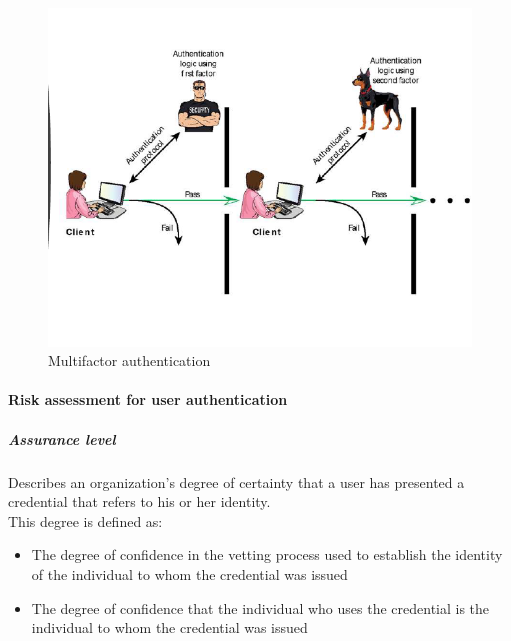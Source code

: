 \documentclass{article}
\begin{document}
                \begin{figure}[h]
                    \begin{center}
                        \includegraphics[scale=0.8]{../immagini/Multifactor_Authentication.png}
                    \end{center}
                    \caption{Multifactor
                    authentication}
                \end{figure}
            
                \paragraph{Risk
                assessment
                for user
                authentication}
                    \subparagraph{Assurance level}
                    Describes an
                    organization’s
                    degree of
                    certainty that a
                    user has
                    presented a
                    credential that
                    refers to his or
                    her identity. \\
                    This degree is defined as:
                        \begin{itemize}
                            \item The degree of confidence in the vetting process used to establish the identity of the individual to whom the credential was issued
                            \item The degree of confidence that the individual who uses the credential is the individual to whom the credential was issued
                        \end{itemize}
\end{document}

